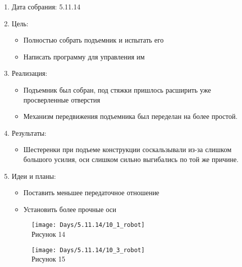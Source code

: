
	\begin{enumerate}
		\item Дата собрания: 5.11.14
		\item Цель:
		\begin{itemize}
			\item Полностью собрать подъемник и испытать его
			\item Написать программу для управления им
		\end{itemize}			
		\item Реализация:
		\begin{itemize}
			\item Подъемник был собран, под стяжки пришлось расширить уже просверленные отверстия
			\item Механизм передвижения подъемника был переделан на более простой.
		\end{itemize}
		\item Результаты:
		\begin{itemize}
			\item Шестеренки при подъеме конструкции соскальзывали из-за слишком большого усилия, оси слишком сильно выгибались по той же причине.
		\end{itemize}
		\item Идеи и планы:
		\begin{itemize}
			\item Поставить меньшее передаточное отношение
			\item Установить более прочные оси
		\end{itemize}
		\begin{figure} [h]
			\centering
			\begin{minipage}{0.3\linewidth}
				\texttt{[image: Days/5.11.14/10\_1\_robot]}\\ Рисунок 14
			\end{minipage}
			\begin{minipage}{0.3\linewidth}
				\texttt{[image: Days/5.11.14/10\_3\_robot]}\\ Рисунок 15
			\end{minipage}
		\end{figure}
	\end{enumerate}
\fillpage
\newpage